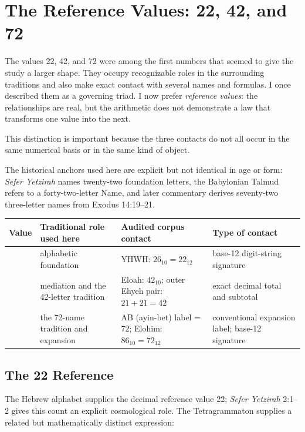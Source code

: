 \section{The Reference Values: 22, 42, and 72}

The values 22, 42, and 72 were among the first numbers that seemed to give the study a larger shape. They occupy recognizable roles in the surrounding traditions and also make exact contact with several names and formulas. I once described them as a governing triad. I now prefer \emph{reference values}: the relationships are real, but the arithmetic does not demonstrate a law that transforms one value into the next.

This distinction is important because the three contacts do not all occur in the same numerical basis or in the same kind of object.

The historical anchors used here are explicit but not identical in age or form: \emph{Sefer Yetzirah} names twenty-two foundation letters, the Babylonian Talmud refers to a forty-two-letter Name, and later commentary derives seventy-two three-letter names from Exodus 14:19--21.\cite{seferyetzirah22,kiddushin42,bahya72}

\begin{center}
\small
\begin{tabular}{>{\raggedright\arraybackslash}p{1.1cm}>{\raggedright\arraybackslash}p{3.2cm}>{\raggedright\arraybackslash}p{5.4cm}>{\raggedright\arraybackslash}p{3.4cm}}
\toprule
Value & Traditional role used here & Audited corpus contact & Type of contact \\
\midrule
22 & alphabetic foundation & YHWH: $26_{10}=22_{12}$ & base-12 digit-string signature \\
42 & mediation and the 42-letter tradition & Eloah: $42_{10}$; outer Ehyeh pair: $21+21=42$ & exact decimal total and subtotal \\
72 & the 72-name tradition and expansion & AB (ayin-bet) label = 72; Elohim: $86_{10}=72_{12}$ & conventional expansion label; base-12 signature \\
\bottomrule
\end{tabular}
\end{center}

\subsection{The 22 Reference}

The Hebrew alphabet supplies the decimal reference value 22; \emph{Sefer Yetzirah} 2:1--2 gives this count an explicit cosmological role.\cite{seferyetzirah22} The Tetragrammaton supplies a related but mathematically distinct expression:

